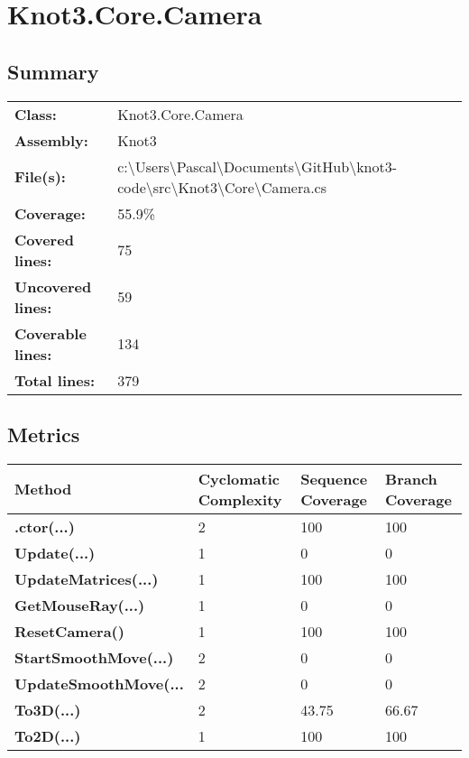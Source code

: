 \documentclass[a4paper,10pt]{article}
\begin{document}
\section{Knot3.Core.Camera}
\subsection{Summary}
\begin{longtable}[l]{ll}
\textbf{Class:} & Knot3.Core.Camera\\
\textbf{Assembly:} & Knot3\\
\textbf{File(s):} & \begin{minipage}[t]{12cm}{c:\textbackslash Users\textbackslash Pascal\textbackslash Documents\textbackslash GitHub\textbackslash knot3-code\textbackslash src\textbackslash Knot3\textbackslash Core\textbackslash Camera.cs}\end{minipage} \\
\textbf{Coverage:} & 55.9\%\\
\textbf{Covered lines:} & 75\\
\textbf{Uncovered lines:} & 59\\
\textbf{Coverable lines:} & 134\\
\textbf{Total lines:} & 379\\
\end{longtable}
\subsection{Metrics}
\begin{longtable}[l]{|l|l|l|l|}
\hline
\textbf{Method} & \textbf{Cyclomatic Complexity} & \textbf{Sequence Coverage} & \textbf{Branch Coverage}\\
\hline
\textbf{.ctor(...)} & 2 & 100 & 100\\
\hline
\textbf{Update(...)} & 1 & 0 & 0\\
\hline
\textbf{UpdateMatrices(...)} & 1 & 100 & 100\\
\hline
\textbf{GetMouseRay(...)} & 1 & 0 & 0\\
\hline
\textbf{ResetCamera()} & 1 & 100 & 100\\
\hline
\textbf{StartSmoothMove(...)} & 2 & 0 & 0\\
\hline
\textbf{UpdateSmoothMove(...} & 2 & 0 & 0\\
\hline
\textbf{To3D(...)} & 2 & 43.75 & 66.67\\
\hline
\textbf{To2D(...)} & 1 & 100 & 100\\
\hline
\end{longtable}
\end{document}
